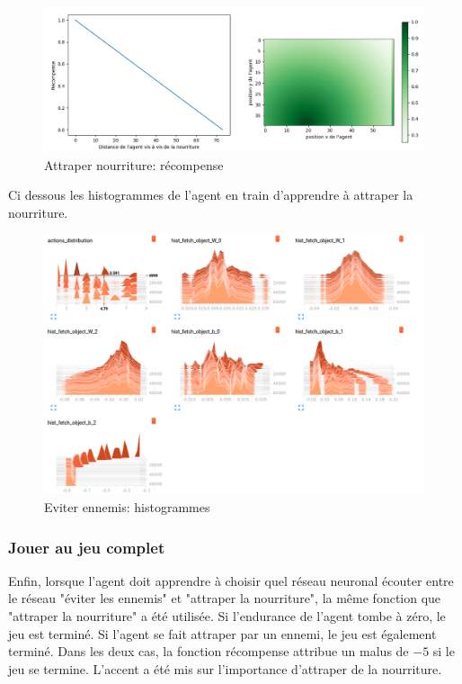 \documentclass[11pt,a4paper]{report}
\begin{document}
     \begin{figure}[!h]
   \center
   \includegraphics[scale=0.4]{ressources/reward_function_fetch_food.png}
   \caption{Attraper nourriture: récompense}
   \end{figure} 
   
  \par Ci dessous les histogrammes de l'agent en train d'apprendre à attraper la nourriture. 
        
   \begin{figure}[!h]
   \center
   \includegraphics[scale=0.4]{ressources/reward_function_histograms_fetch_food.png}
   \caption{Eviter ennemis: histogrammes}
   \end{figure} 
   
   \subsubsection{Jouer au jeu complet}
   
   \par Enfin, lorsque l'agent doit apprendre à choisir quel réseau neuronal écouter entre le réseau "éviter les ennemis" et "attraper la nourriture", la même fonction que "attraper la nourriture" a été utilisée. Si l'endurance de l'agent tombe à zéro, le jeu est terminé. Si l'agent se fait attraper par un ennemi, le jeu est également terminé. Dans les deux cas, la fonction récompense attribue un malus de $-5$ si le jeu se termine. L'accent a été mis sur l'importance d'attraper de la nourriture.
   
\end{document}
